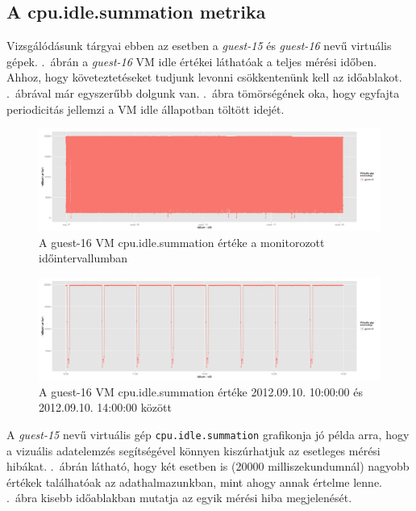 \documentclass[a4paper,10pt,titlepage]{article}
\begin{document}
\subsection{A cpu.idle.summation metrika}

Vizsgálódásunk tárgyai ebben az esetben a \textit{guest-15} és \textit{guest-16} nevű virtuális gépek. .~ábrán a \textit{guest-16} VM idle értékei láthatóak a teljes mérési időben. Ahhoz, hogy követeztetéseket tudjunk levonni csökkentenünk kell az időablakot. .~ábrával már egyszerűbb dolgunk van. .~ábra tömörségének oka, hogy egyfajta periodicitás jellemzi a VM idle állapotban töltött idejét. 

\begin{figure}[h!]
\centering
\includegraphics[width=1.00\textwidth]{figures/cpu_idle_summation-guest-16-20120826230140-20120924083120.png}
\caption{A guest-16 VM cpu.idle.summation értéke a monitorozott időintervallumban \label{fig:cpu_idle_summation_g16_1}}
\end{figure}

\begin{figure}[h!]
\centering
\includegraphics[width=1.00\textwidth]{figures/cpu_idle_summation-guest-16-20120910100000-20120910140000.png}
\caption{A guest-16 VM cpu.idle.summation értéke 2012.09.10. 10:00:00 és 2012.09.10. 14:00:00 között \label{fig:cpu_idle_summation_g16_2}}
\end{figure}

A \textit{guest-15} nevű virtuális gép \texttt{cpu.idle.summation} grafikonja jó példa arra, hogy a vizuális adatelemzés segítségével könnyen kiszúrhatjuk az esetleges mérési hibákat. .~ábrán látható, hogy két esetben is (20000 milliszekundumnál) nagyobb értékek találhatóak az adathalmazunkban, mint ahogy annak értelme lenne. .~ábra kisebb időablakban mutatja az egyik mérési hiba megjelenését.
\end{document}
